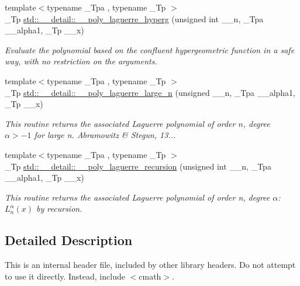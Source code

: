 \begin{DoxyCompactItemize}
{\footnotesize template$<$typename \+\_\+\+Tpa , typename \+\_\+\+Tp $>$ }\\\+\_\+\+Tp \hyperlink{namespacestd_1_1____detail_a1c817d7f5df1147829ad745176325cd6}{std\+::\+\_\+\+\_\+detail\+::\+\_\+\+\_\+poly\+\_\+laguerre\+\_\+hyperg} (unsigned int \+\_\+\+\_\+n, \+\_\+\+Tpa \+\_\+\+\_\+alpha1, \+\_\+\+Tp \+\_\+\+\_\+x)
\begin{DoxyCompactList}\small\item\em Evaluate the polynomial based on the confluent hypergeometric function in a safe way, with no restriction on the arguments. \end{DoxyCompactList}\item 
{\footnotesize template$<$typename \+\_\+\+Tpa , typename \+\_\+\+Tp $>$ }\\\+\_\+\+Tp \hyperlink{namespacestd_1_1____detail_a1f9e78deb2bcc73511c77dcb1cdcf4c8}{std\+::\+\_\+\+\_\+detail\+::\+\_\+\+\_\+poly\+\_\+laguerre\+\_\+large\+\_\+n} (unsigned \+\_\+\+\_\+n, \+\_\+\+Tpa \+\_\+\+\_\+alpha1, \+\_\+\+Tp \+\_\+\+\_\+x)
\begin{DoxyCompactList}\small\item\em This routine returns the associated Laguerre polynomial of order $ n $, degree $ \alpha > -1 $ for large n. Abramowitz \& Stegun, 13... \end{DoxyCompactList}\item 
{\footnotesize template$<$typename \+\_\+\+Tpa , typename \+\_\+\+Tp $>$ }\\\+\_\+\+Tp \hyperlink{namespacestd_1_1____detail_a6d3a7499bd109d5c0ea01e85f3165730}{std\+::\+\_\+\+\_\+detail\+::\+\_\+\+\_\+poly\+\_\+laguerre\+\_\+recursion} (unsigned int \+\_\+\+\_\+n, \+\_\+\+Tpa \+\_\+\+\_\+alpha1, \+\_\+\+Tp \+\_\+\+\_\+x)
\begin{DoxyCompactList}\small\item\em This routine returns the associated Laguerre polynomial of order {\ttfamily n}, degree {\ttfamily $ \alpha $}\+: $ L_n^\alpha(x) $ by recursion. \end{DoxyCompactList}\end{DoxyCompactItemize}


\subsection{Detailed Description}
This is an internal header file, included by other library headers. Do not attempt to use it directly. Instead, include $<$cmath$>$. 

